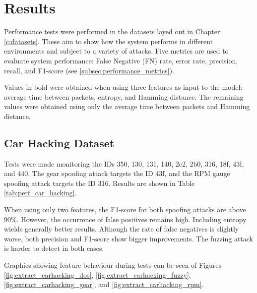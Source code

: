 \chapter{Results}
\label{c:results}

Performance tests were performed in the datasets layed out in Chapter \ref{c:datasets}. These aim to show how the system performs in different environments and subject to a variety of attacks. Five metrics are used to evaluate system performance: False Negative (FN) rate, error rate, precision, recall, and F1-score (see \ref{subsec:performance_metrics}).\par
Values in bold were obtained when using three features as input to the model: average time between packets, entropy, and Hamming distance. The remaining values were obtained using only the average time between packets and Hamming distance.

\section{Car Hacking Dataset}

Tests were made monitoring the IDs 350, 130, 131, 140, 2c2, 2b0, 316, 18f, 43f, and 440. The gear spoofing attack targets the ID 43f, and the RPM gauge spoofing attack targets the ID 316. Results are shown in Table \ref{tab:perf_car_hacking}.\par
When using only two features, the F1-score for both spoofing attacks are above 90\%. However, the occurrence of false positives remains high. Including entropy wields generally better results. Although the rate of false negatives is slightly worse, both precision and F1-score show bigger improvements. The fuzzing attack is harder to detect in both cases.\par
Graphics showing feature behaviour during tests can be seen of Figures \ref{fig:extract_carhacking_dos}, \ref{fig:extract_carhacking_fuzzy}, \ref{fig:extract_carhacking_gear}, and \ref{fig:extract_carhacking_rpm}.

